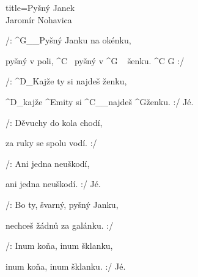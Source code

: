 \begin{song}{title=\predtitle\centering Pyšný Janek \\\large Jaromír Nohavica  \vspace*{-0.3cm}}  %
\begin{centerjustified}
\nejnejvetsi

\sloka 
	/: ^{G{\color{white}\_\_}}Pyšný Janku na okénku,

	pyšný v poli, ^{C\,\,\,\,\,}pyšný v ^{G\,\,\,\,\,\,\,}šenku. ^{C\,\,G} :/
	
	/: ^{D{\color{white}\_}}Kajže ty si najdeš ženku,
	
	^{D{\color{white}\_}}kajže ^{Emi}ty si ^{C{\color{white}\_\_}}najdeš ^{G}ženku. :/ Jé.

\sloka
	/: Děvuchy do kola chodí,

	za ruky se spolu vodí. :/
	
	/: Ani jedna neuškodí,
	
	ani jedna neuškodí. :/ Jé.

\sloka
	/: Bo ty, švarný, pyšný Janku,
	
	nechceš žádnů za galánku. :/
	
	/: Inum koňa, inum šklanku,

	inum koňa, inum šklanku. :/ Jé.

\end{centerjustified}
\setcounter{Slokočet}{0}
\end{song}

